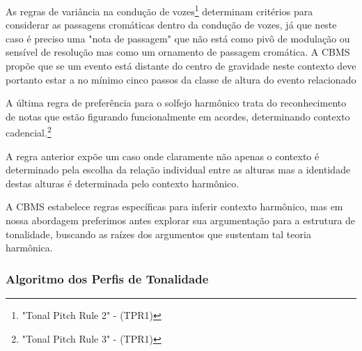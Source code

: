 \documentclass[
	12pt,				%
	openright,			%
	twoside,			%
	a4paper,			%
	english,			%
	french,				%
	spanish,			%
	brazil				%
	]{abntex2}
\begin{document}
As regras de variância na condução de vozes\footnote{"Tonal Pitch Rule 2" - (TPR1)\cite[ p.129]{temperley2004cognition}} determinam critérios para considerar as passagens cromáticas dentro da condução de vozes, já que neste caso é preciso uma "nota de passagem" que não está como pivô de modulação ou sensível de resolução mas como um ornamento de passagem cromática. A CBMS propõe que se um evento está distante do centro de gravidade neste contexto deve portanto estar a no mínimo cinco passos da classe de altura do evento relacionado\cite[ p.130]{temperley1997algorithm}

A última regra de preferência para o solfejo harmônico trata do reconhecimento de notas que estão figurando funcionalmente em acordes, determinando contexto cadencial.\footnote{"Tonal Pitch Rule 3" - (TPR1)\cite[ p.131]{temperley2004cognition}}

A regra anterior expõe um caso onde claramente não apenas o contexto é determinado pela escolha da relação individual entre as alturas  mas a identidade destas alturas é determinada pelo contexto harmônico. 

A CBMS estabelece regras específicas para inferir contexto harmônico, mas em nossa abordagem preferimos antes explorar sua argumentação para a estrutura de tonalidade, buscando as raízes dos argumentos que sustentam tal teoria harmônica. 


\pagebreak
\subsubsection{Algoritmo dos Perfis de Tonalidade}

\lipsum[30]
\end{document}
